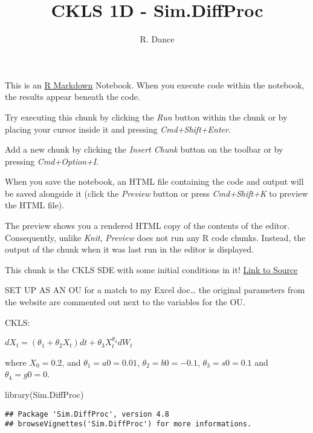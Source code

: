 \documentclass[
]{article}
\title{CKLS 1D - Sim.DiffProc}
\author{R. Dance}
\date{}
\newenvironment{Shaded}{\begin{snugshade}}{\end{snugshade}}
\newcommand{\FunctionTok}[1]{\textcolor[rgb]{0.00,0.00,0.00}{#1}}
\newcommand{\NormalTok}[1]{#1}
\begin{document}
\maketitle

{
\setcounter{tocdepth}{2}
\tableofcontents
}
This is an \href{http://rmarkdown.rstudio.com}{R Markdown} Notebook.
When you execute code within the notebook, the results appear beneath
the code.

Try executing this chunk by clicking the \emph{Run} button within the
chunk or by placing your cursor inside it and pressing
\emph{Cmd+Shift+Enter}.

Add a new chunk by clicking the \emph{Insert Chunk} button on the
toolbar or by pressing \emph{Cmd+Option+I}.

When you save the notebook, an HTML file containing the code and output
will be saved alongside it (click the \emph{Preview} button or press
\emph{Cmd+Shift+K} to preview the HTML file).

The preview shows you a rendered HTML copy of the contents of the
editor. Consequently, unlike \emph{Knit}, \emph{Preview} does not run
any R code chunks. Instead, the output of the chunk when it was last run
in the editor is displayed.

This chunk is the CKLS SDE with some initial conditions in it!
\href{https://cran.r-project.org/web/packages/Sim.DiffProc/vignettes/fitsde.html}{Link
to Source}

SET UP AS AN OU for a match to my Excel doc\ldots{} the original
parameters from the website are commented out next to the variables for
the OU.

CKLS:

\(dX_t = (\theta_1 +\theta_2X_t)dt + \theta_3X_t^{\theta_4}dW_t\)

where \(X_0=0.2\), and \(\theta_1=a0 = 0.01\), \(\theta_2 = b0 = -0.1\),
\(\theta_3 = s0 = 0.1\) and \(\theta_4 = g0 = 0\).

\begin{Shaded}
\begin{Highlighting}[]
\FunctionTok{library}\NormalTok{(Sim.DiffProc)}
\end{Highlighting}
\end{Shaded}

\begin{verbatim}
## Package 'Sim.DiffProc', version 4.8
## browseVignettes('Sim.DiffProc') for more informations.
\end{verbatim}
\end{document}
